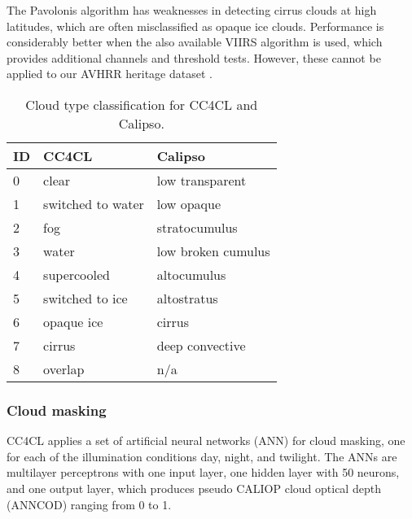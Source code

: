 The Pavolonis algorithm has weaknesses in detecting cirrus clouds at high latitudes, which are often misclassified as opaque ice clouds. Performance is considerably better when the also available VIIRS algorithm is used, which provides additional channels and threshold tests. However, these cannot be applied to our AVHRR heritage dataset \citep{Pavolonis05}.

\begin{table}[h]
  \caption{Cloud type classification for CC4CL and Calipso.}
  \begin{tabular}{l|ll}
    \hline
    ID & CC4CL & Calipso \\
    \hline
    0 & clear & low transparent \\
    1 & switched to water & low opaque \\
    2 & fog & stratocumulus \\
    3 & water & low broken cumulus \\
    4 & supercooled & altocumulus \\
    5 & switched to ice & altostratus \\
    6 & opaque ice & cirrus \\
    7 & cirrus & deep convective \\
    8 & overlap & n/a \\
    \hline
  \end{tabular}
  \label{tab:cloud_types}
\end{table}

\subsubsection{Cloud masking}\label{sec:CloudMask}

CC4CL applies a set of artificial neural networks (ANN) for cloud masking, one for each of the illumination conditions day, night, and twilight. The ANNs are multilayer perceptrons with one input layer, one hidden layer with 50 neurons, and one output layer, which produces pseudo CALIOP cloud optical depth (ANNCOD) ranging from 0 to 1. 

